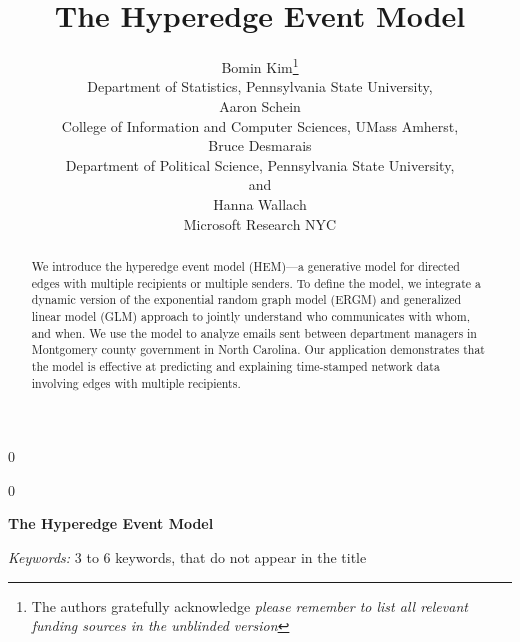 \documentclass[12pt]{article}
\newcommand{\blind}{0}
\begin{document}
\def\spacingset#1{\renewcommand{\baselinestretch}%
{#1}\small\normalsize} \spacingset{1}



\blind
{
  \title{\bf The Hyperedge Event Model}
  \author{Bomin Kim\thanks{
    The authors gratefully acknowledge \textit{please remember to list all relevant funding sources in the unblinded version}}\hspace{.2cm}\\
    Department of Statistics, Pennsylvania State University,\\
  Aaron Schein\\
  College of Information and Computer Sciences, UMass Amherst,\\
    Bruce Desmarais\\
    Department of Political Science, Pennsylvania State University,\\
    and\\
    Hanna Wallach\\
    Microsoft Research NYC}
  \maketitle
} \fi
{}\blind
{
  \bigskip
  \bigskip
  \bigskip
  \begin{center}
    {\LARGE\bf The Hyperedge Event Model}
\end{center}
  \medskip
} \fi

\bigskip
\begin{abstract}
We introduce the hyperedge event model (HEM)---a generative model for directed edges with multiple recipients or multiple senders. To define the model, we
integrate a dynamic version of the exponential random graph model (ERGM) and generalized linear model (GLM) approach to jointly understand who communicates with whom, and when. We use the model to analyze emails sent between department managers in Montgomery county government in North Carolina. Our application demonstrates that the model is effective at predicting and explaining time-stamped network data involving edges with multiple recipients.
	\end{abstract}

\noindent%
{\it Keywords:}  3 to 6 keywords, that do not appear in the title
\vfill

\newpage
\spacingset{1.45} %
\end{document}
